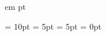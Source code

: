  em
 pt





\usepackage[font={small,sf},labelfont=bf]{caption} %
\renewcommand\floatpagefraction{.8}
\renewcommand\topfraction{.8}
\renewcommand\bottomfraction{.8}
\renewcommand\textfraction{.2}
\floatsep = 10pt  		%
\abovecaptionskip = 5pt 	%
\belowcaptionskip = 5pt	%
\dbltextfloatsep = 0pt 	%




\newcommand{\Line}[0]{
\vspace{-20pt}    %
\rule{0pt}{0pt}\hrule\rule{0pt}{0pt}
}


\newcommand{\SkipSection}[2]{
	\ifnum #1 = 1
	\else 
		#2
	\fi
}


